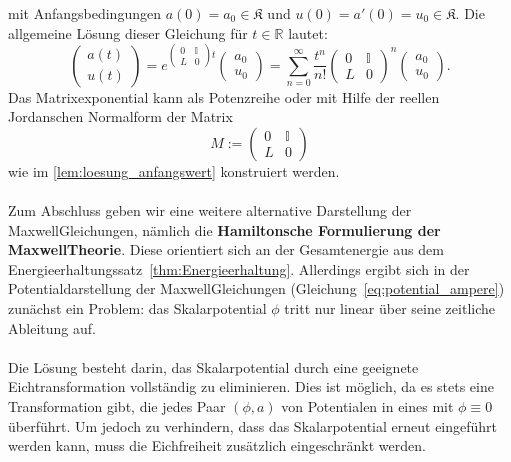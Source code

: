 \documentclass[11pt,a4paper,leqno]{report}
\numberwithin{equation}{chapter}
\begin{document}
mit Anfangsbedingungen \( a(0) = a_0 \in \mathfrak{K} \) und \( u(0) = a'(0) = u_0 \in \mathfrak{K} \). Die allgemeine Lösung dieser Gleichung für \( t \in \mathbb{R} \) lautet:
\begin{equation}
	\begin{pmatrix}
		a(t) \\
		u(t)
	\end{pmatrix}
	=
	e^{ 
		\begin{pmatrix}
			0 & \mathbb{I} \\
			L & 0
		\end{pmatrix} t 
	}
	\begin{pmatrix}
		a_0 \\
		u_0
	\end{pmatrix}
	= \sum_{n=0}^\infty \frac{t^n}{n!}
	\begin{pmatrix}
		0 & \mathbb{I} \\
		L & 0
	\end{pmatrix}^n
	\begin{pmatrix}
		a_0 \\
		u_0
	\end{pmatrix}.
\end{equation}
Das Matrixexponential kann als Potenzreihe oder mit Hilfe der reellen Jordanschen Normalform der Matrix 
\[
M := \begin{pmatrix}
	0 & \mathbb{I} \\
	L & 0
\end{pmatrix}
\] 
wie im \eqref{lem:loesung_anfangswert} konstruiert werden.
\\
\\
Zum Abschluss geben wir eine weitere alternative Darstellung der Maxwell\-Gleichungen, 
nämlich die \textbf{Hamiltonsche Formulierung der Maxwell\-Theorie}. 
Diese orientiert sich an der Gesamtenergie aus dem Energieerhaltungssatz~\ref{thm:Energieerhaltung}. 
Allerdings ergibt sich in der Potentialdarstellung der Maxwell\-Gleichungen 
(Gleichung~\eqref{eq:potential_ampere}) zunächst ein Problem: 
das Skalarpotential \(\phi\) tritt nur linear über seine zeitliche Ableitung auf. \\
\\
Die Lösung besteht darin, das Skalarpotential durch eine geeignete Eichtransformation 
vollständig zu eliminieren. Dies ist möglich, da es stets eine Transformation gibt, 
die jedes Paar \((\phi, a)\) von Potentialen in eines mit \(\phi \equiv 0\) überführt. 
Um jedoch zu verhindern, dass das Skalarpotential erneut eingeführt werden kann, 
muss die Eichfreiheit zusätzlich eingeschränkt werden.  
\end{document}
